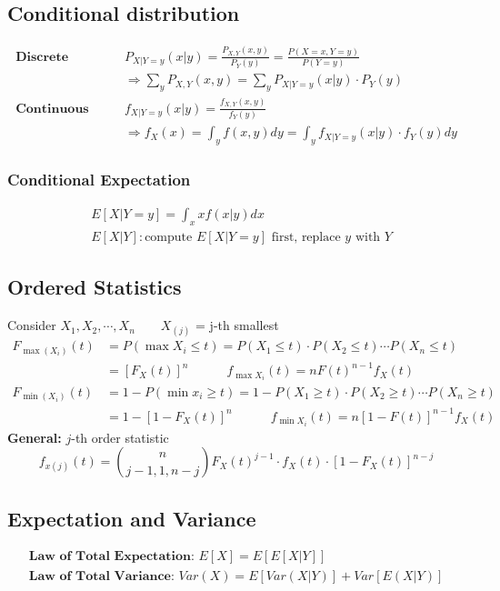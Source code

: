 \subsection*{Conditional distribution}
\begin{align*}
	\textbf{Discrete} \quad \quad
	& P_{X|Y=y}(x|y) = \frac{P_{X,Y}(x,y)}{P_Y(y)} = \frac{P(X=x, Y=y)}{P(Y=y)}\\
  & \Rightarrow \sum\limits_y P_{X,Y}(x,y) = \sum\limits_y P_{X|Y=y}(x|y) \cdot P_Y(y)\\
  \textbf{Continuous} \quad \quad & f_{X|Y=y}(x|y) = \frac{f_{X,Y}(x,y)}{f_Y(y)}\\
  & \Rightarrow f_X(x) = \int_y f(x,y)dy = \int_y f_{X|Y=y}(x|y)\cdot f_Y(y)dy
\end{align*}
\subsubsection*{Conditional Expectation}
\begin{align*}
	& E[X|Y=y] = \int_x xf(x|y) dx\\
	& E[X|Y]: \text{compute } E[X|Y=y] \text{ first, replace $y$ with $Y$}
\end{align*}
\subsection*{Ordered Statistics}
Consider $X_1, X_2, \cdots, X_n \quad \quad X_{(j)}$ = j-th smallest
\begin{align*}
	F_{\max(X_i)}(t) & = P(\max X_i \leq t) = P(X_1 \leq t)\cdot P(X_2 \leq t) \cdots P(X_n \leq t)\\
	& = [F_X(t)]^n \quad \quad \quad
	\boxed{f_{\max X_i}(t) = nF(t)^{n-1} f_X(t)}\\
	 F_{\min(X_i)}(t) & = 1 - P(\min x_i \geq t) = 1-P(X_1 \geq t)\cdot P(X_2 \geq t) \cdots P(X_n \geq t)\\
	 & = 1 - [1 - F_X(t)]^n \quad \quad \quad \boxed{f_{\min X_i}(t) = n[1 - F(t)]^{n-1} f_X(t)}
\end{align*}
\textbf{General:} $j$-th order statistic
\begin{equation*}
	f_{x(j)}(t) = \binom{n}{j-1,1,n-j} F_X(t)^{j-1}\cdot f_X(t) \cdot [1-F_X(t)]^{n-j}
\end{equation*}
\subsection*{Expectation and Variance}
\begin{gather*}
	\textbf{Law of Total Expectation: } E[X] = E[E[X|Y]]\\
\textbf{Law of Total Variance: } Var(X) = E[Var(X|Y)] + Var[E(X|Y)]
\end{gather*}
